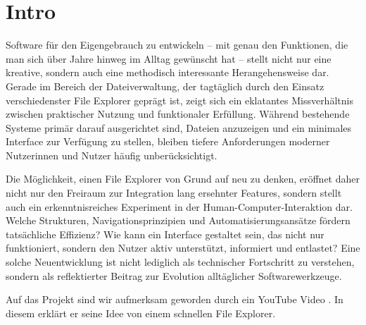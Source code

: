 \section{Intro} 
Software für den Eigengebrauch zu entwickeln – mit genau den Funktionen, die man sich über Jahre hinweg im Alltag
gewünscht hat – stellt nicht nur eine kreative, sondern auch eine methodisch interessante Herangehensweise dar. Gerade im Bereich
der Dateiverwaltung, der tagtäglich durch den Einsatz verschiedenster File Explorer geprägt ist, zeigt sich ein eklatantes
Missverhältnis zwischen praktischer Nutzung und funktionaler Erfüllung. Während bestehende Systeme primär darauf ausgerichtet
sind, Dateien anzuzeigen und ein minimales Interface zur Verfügung zu stellen, bleiben tiefere Anforderungen moderner Nutzerinnen
und Nutzer häufig unberücksichtigt.

Die Möglichkeit, einen File Explorer von Grund auf neu zu denken, eröffnet daher nicht nur den Freiraum zur Integration lang
ersehnter Features, sondern stellt auch ein erkenntnisreiches Experiment in der Human-Computer-Interaktion dar. Welche Strukturen,
Navigationsprinzipien und Automatisierungsansätze fördern tatsächliche Effizienz? Wie kann ein Interface gestaltet sein, das nicht
nur funktioniert, sondern den Nutzer aktiv unterstützt, informiert und entlastet? Eine solche Neuentwicklung ist nicht lediglich
als technischer Fortschritt zu verstehen, sondern als reflektierter Beitrag zur Evolution alltäglicher Softwarewerkzeuge.

Auf das Projekt sind wir aufmerksam geworden durch ein YouTube Video \cite{connaticus01}. In diesem erklärt er seine Idee von
einem schnellen File Explorer. 

